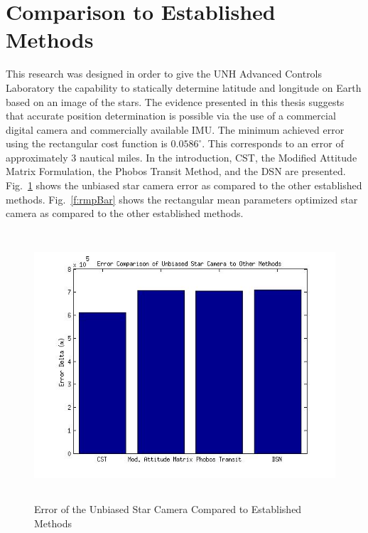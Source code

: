 \documentclass[12pt,a4paper]{book}
\begin{document}
\section{Comparison to Established Methods}
This research was designed in order to give the UNH Advanced Controls Laboratory the capability to statically determine latitude and longitude on  Earth based on an image of the stars.  The evidence presented in this thesis suggests that accurate position determination is possible via the use of a commercial digital camera and commercially available IMU. The minimum achieved error using the rectangular cost function is $0.0586^{\circ}$.  This corresponds to an error of approximately 3 nautical miles.  In the introduction, CST, the Modified Attitude Matrix Formulation, the Phobos Transit Method, and the DSN are presented.  Fig.~\ref{f:unbiasedBar} shows the unbiased star camera error as compared to the other established methods.  Fig.~\ref{f:rmpBar} shows the rectangular mean parameters optimized star camera as compared to the other established methods.
\begin{figure}[!ht]
\centering
\includegraphics[height=10cm]{unbiasedBars.jpg}
\caption{Error of the Unbiased Star Camera Compared to Established Methods}\label{f:unbiasedBar}
\end{figure}
\end{document}
